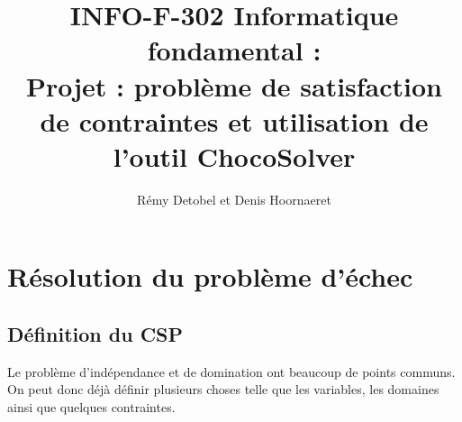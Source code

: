 \documentclass[a4paper,11pt]{article}
\title{INFO-F-302 Informatique fondamental :\\Projet : problème de satisfaction de contraintes et utilisation de l'outil ChocoSolver}
\author{Rémy Detobel et Denis Hoornaeret}
\begin{document}
\maketitle
\setcounter{tocdepth}{2}
\tableofcontents

\newpage

\section{Résolution du problème d'échec}
	
    \subsection{Définition du CSP}
    	Le problème d'indépendance et de domination ont beaucoup de points communs. On peut donc déjà définir plusieurs choses telle que les variables, les domaines ainsi que quelques contraintes. 
    	
\end{document}
